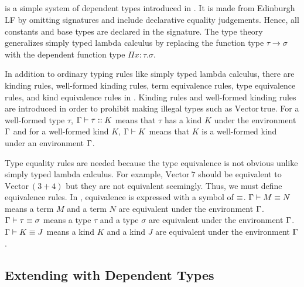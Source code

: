 



\subsection{\LLF}

\LLF is a simple system of dependent types introduced in \cite{attapl}.
It is made from Edinburgh LF\cite{harper1993framework} by omitting signatures and include declarative equality judgements.
Hence, all constants and base types are declared in the signature.
The \LLF type theory generalizes simply typed lambda calculus
by replacing the function type $\tau\to\sigma$ with the dependent function type $\Pi x:\tau.\sigma$.

In addition to ordinary typing rules like simply typed lambda calculus,
there are kinding rules, well-formed kinding rules, term equivalence rules, type equivalence rules, and kind equivalence rules in \LLF.
Kinding rules and well-formed kinding rules are 
introduced in order to prohibit making illegal types such as $\textrm{Vector}\ \textrm{true}$.
For a well-formed type $\tau$, $\Gamma \vdash \tau :: K$ means that $\tau$ has a kind $K$ under the environment $\Gamma$ and 
for a well-formed kind $K$, $\Gamma \vdash K$ means that $K$ is a well-formed kind under an environment $\Gamma$.

Type equality rules are needed because the type equivalence is not obvious unlike simply typed lambda calculus.
For example, $\textrm{Vector}\ 7$ should be equivalent to $\textrm{Vector}\ (3+4)$
but they are not equivalent seemingly. Thus, we must define equivalence rules.
In \LLF, equivalence is expressed with a symbol of $\equiv$.
$\Gamma \vdash M \equiv N$ means a term $M$ and a term $N$ are equivalent under the environment $\Gamma$.
$\Gamma \vdash \tau \equiv \sigma$ means a type $\tau$ and a type $\sigma$ are equivalent under the environment $\Gamma$.
$\Gamma \vdash K \equiv J$ means a kind $K$ and a kind $J$ are equivalent under the environment $\Gamma$.

\subsection{Extending \LTP with Dependent Types}

